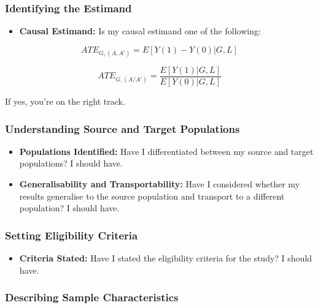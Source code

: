 \documentclass[
  singlecolumn]{article}
\providecommand{\tightlist}{%
  \setlength{\itemsep}{0pt}\setlength{\parskip}{0pt}}\usepackage{longtable,booktabs,array}
\begin{document}
\hypertarget{identifying-the-estimand}{%
\subsubsection{Identifying the
Estimand}\label{identifying-the-estimand}}

\begin{itemize}
\tightlist
\item
  \textbf{Causal Estimand:} Is my causal estimand one of the following:
\end{itemize}

\[ATE_{G,(A,A')} = E[Y(1) - Y(0)|G, L]\]

\[ATE_{G,(A/A')} = \frac{E[Y(1)|G, L]}{E[Y(0)|G, L]}\]

If yes, you're on the right track.

\hypertarget{understanding-source-and-target-populations}{%
\subsubsection{Understanding Source and Target
Populations}\label{understanding-source-and-target-populations}}

\begin{itemize}
\tightlist
\item
  \textbf{Populations Identified:} Have I differentiated between my
  source and target populations? I should have.
\item
  \textbf{Generalisability and Transportability:} Have I considered
  whether my results generalise to the source population and transport
  to a different population? I should have.
\end{itemize}

\hypertarget{setting-eligibility-criteria}{%
\subsubsection{Setting Eligibility
Criteria}\label{setting-eligibility-criteria}}

\begin{itemize}
\tightlist
\item
  \textbf{Criteria Stated:} Have I stated the eligibility criteria for
  the study? I should have.
\end{itemize}

\hypertarget{describing-sample-characteristics}{%
\subsubsection{Describing Sample
Characteristics}\label{describing-sample-characteristics}}
\end{document}
